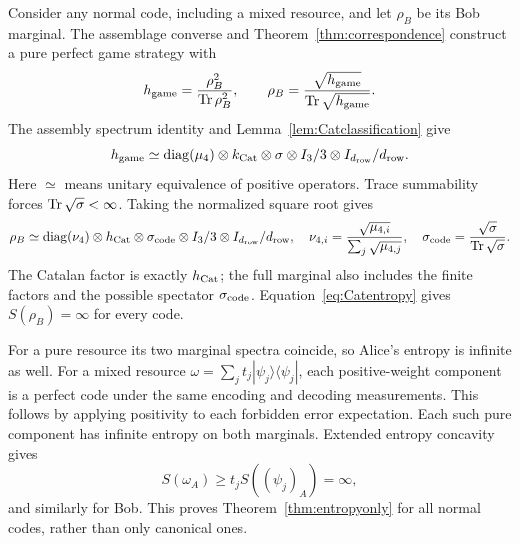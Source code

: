 Consider any normal code, including a mixed resource, and let $\rho_B$ be its Bob marginal. The assemblage converse and Theorem~\ref{thm:correspondence} construct a pure perfect game strategy with
\[
 h_{\rm game}=\frac{\rho_B^2}{\operatorname{Tr}\rho_B^2},\qquad
 \rho_B=\frac{\sqrt{h_{\rm game}}}{\operatorname{Tr}\sqrt{h_{\rm game}}}.
\]
The assembly spectrum identity and Lemma~\ref{lem:Catclassification} give
\[
 h_{\rm game}\simeq
 \operatorname{diag}(\mu_4)\otimes k_{\mathrm{Cat}}\otimes\sigma
 \otimes I_3/3\otimes I_{d_{\mathrm{row}}}/d_{\mathrm{row}}.
\]
Here $\simeq$ means unitary equivalence of positive operators. Trace summability forces $\operatorname{Tr}\sqrt\sigma<\infty$. Taking the normalized square root gives
\begin{equation}\label{eq:codemarginal}
 \rho_B\simeq\operatorname{diag}(\nu_4)\otimes h_{\mathrm{Cat}}\otimes\sigma_{\rm code}
                 \otimes I_3/3\otimes I_{d_{\mathrm{row}}}/d_{\mathrm{row}},
 \quad
 \nu_{4,i}=\frac{\sqrt{\mu_{4,i}}}{\sum_j\sqrt{\mu_{4,j}}},\quad
 \sigma_{\rm code}=\frac{\sqrt\sigma}{\operatorname{Tr}\sqrt\sigma}.
\end{equation}
The Catalan factor is exactly $h_{\mathrm{Cat}}$; the full marginal also includes the finite factors and the possible spectator $\sigma_{\rm code}$. Equation~\eqref{eq:Catentropy} gives $S(\rho_B)=\infty$ for every code.

For a pure resource its two marginal spectra coincide, so Alice's entropy is infinite as well. For a mixed resource $\omega=\sum_jt_j|\psi_j\rangle\langle\psi_j|$, each positive-weight component is a perfect code under the same encoding and decoding measurements. This follows by applying positivity to each forbidden error expectation. Each such pure component has infinite entropy on both marginals. Extended entropy concavity gives
\[
 S(\omega_A)\geq t_j S((\psi_j)_A)=\infty,
\]
and similarly for Bob. This proves Theorem~\ref{thm:entropyonly} for all normal codes, rather than only canonical ones.
